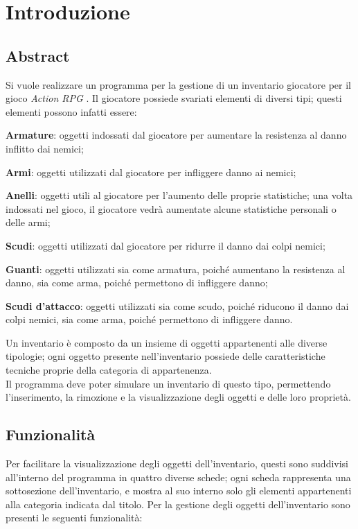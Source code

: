 \section{Introduzione}
\subsection{Abstract}
Si vuole realizzare un programma per la gestione di un inventario giocatore per il gioco \textit{Action RPG} . Il giocatore possiede svariati elementi di diversi tipi; questi elementi possono infatti essere:
\begin{itemize}
  \begin{description}
    \item \textbf{Armature}: oggetti indossati dal giocatore per aumentare la resistenza al danno inflitto dai nemici; \\
    \item \textbf{Armi}: oggetti utilizzati dal giocatore per infliggere danno ai nemici; \\
    \item \textbf{Anelli}: oggetti utili al giocatore per l'aumento delle proprie statistiche; una volta indossati nel gioco, il giocatore vedrà aumentate alcune statistiche personali o delle armi;
    \item \textbf{Scudi}: oggetti utilizzati dal giocatore per ridurre il danno dai colpi nemici;
    \item \textbf{Guanti}: oggetti utilizzati sia come armatura, poiché aumentano la resistenza al danno, sia come arma, poiché permettono di infliggere danno;
    \item \textbf{Scudi d'attacco}: oggetti utilizzati sia come scudo, poiché riducono il danno dai colpi nemici, sia come arma, poiché permettono di infliggere danno.
  \end{description}
\end{itemize}

Un inventario è composto da un insieme di oggetti appartenenti alle diverse tipologie; ogni oggetto presente nell'inventario possiede delle caratteristiche tecniche proprie della categoria di appartenenza. \\
Il programma deve poter simulare un inventario di questo tipo, permettendo l'inserimento, la rimozione e la visualizzazione degli oggetti e delle loro proprietà.


\subsection{Funzionalità}
Per facilitare la visualizzazione degli oggetti dell'inventario, questi sono suddivisi all'interno del programma in quattro diverse schede; ogni scheda rappresenta una sottosezione dell'inventario, e mostra al suo interno solo gli elementi appartenenti alla categoria indicata dal titolo. Per la gestione degli oggetti dell'inventario sono presenti le seguenti funzionalità:

